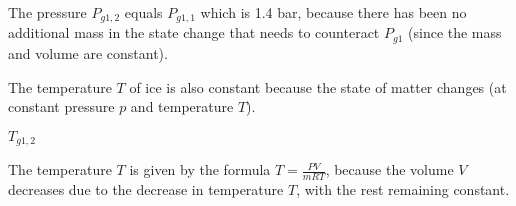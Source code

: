 The pressure \( P_{g1,2} \) equals \( P_{g1,1} \) which is 1.4 bar, because there has been no additional mass in the state change that needs to counteract \( P_{g1} \) (since the mass and volume are constant).

The temperature \( T \) of ice is also constant because the state of matter changes (at constant pressure \( p \) and temperature \( T \)).

\( T_{g1,2} \)

The temperature \( T \) is given by the formula \( T = \frac{PV}{mRT} \), because the volume \( V \) decreases due to the decrease in temperature \( T \), with the rest remaining constant.